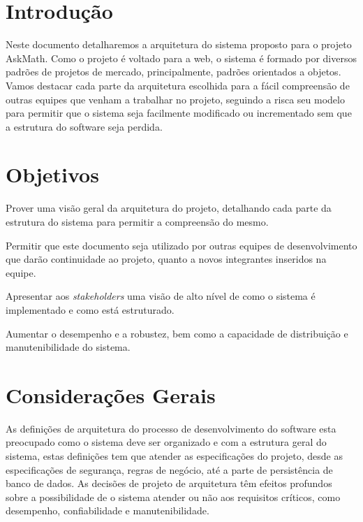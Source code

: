 \label{ap:arquitetura}

\section{Introdução}
Neste documento detalharemos a arquitetura do sistema proposto para o projeto 
AskMath. Como o projeto é voltado para a web, o sistema é formado por diversos 
padrões de projetos de mercado, principalmente, padrões orientados a objetos. 
Vamos destacar cada parte da arquitetura escolhida para a fácil compreensão de 
outras equipes que venham a trabalhar no projeto, seguindo a risca seu modelo 
para permitir que o sistema seja facilmente modificado ou incrementado sem que a 
estrutura do software seja perdida.

\section{Objetivos}
\begin{alineascomponto}
	\item Prover uma visão geral da arquitetura do projeto, detalhando cada 
parte da estrutura do sistema para permitir a compreensão do mesmo.
    \item Permitir que este documento seja utilizado por outras equipes de 
desenvolvimento que dar\~ao continuidade ao projeto, quanto a novos 
integrantes inseridos na equipe.
    \item Apresentar aos \textit{stakeholders} uma visão de alto nível de como o 
sistema é implementado e como est\'a estruturado.
    \item Aumentar o desempenho e a robustez, bem como a capacidade de 
distribuição e manutenibilidade do sistema.
\end{alineascomponto}

\section{Considerações Gerais}
As definições de arquitetura do processo de desenvolvimento do software esta 
preocupado como o sistema deve ser organizado e com a estrutura geral do 
sistema, estas definições tem que atender as especificações do projeto, desde as 
especificações de segurança, regras de negócio, até a parte de persistência de 
banco de dados. As decisões de projeto de arquitetura têm efeitos profundos 
sobre a possibilidade de o sistema atender ou não aos requisitos críticos, como 
desempenho, confiabilidade e manutenibilidade.


